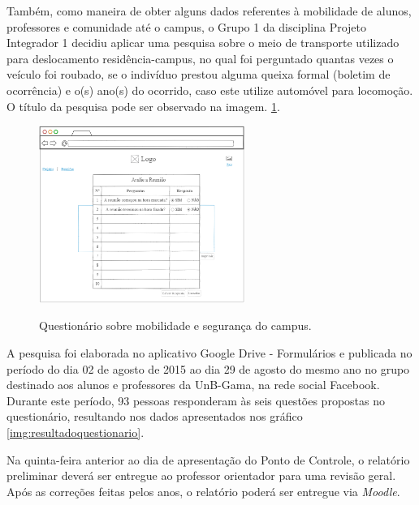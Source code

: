 Também, como maneira de obter alguns dados referentes à mobilidade de alunos, professores e comunidade até o campus, o Grupo 1 da disciplina Projeto Integrador 1 decidiu aplicar uma pesquisa sobre o meio de transporte utilizado para deslocamento residência-campus, no qual foi perguntado quantas vezes o veículo foi roubado, se o indivíduo prestou alguma queixa formal (boletim de ocorrência) e o(s) ano(s) do ocorrido, caso este utilize automóvel para locomoção. O título da pesquisa pode ser observado na imagem. \ref{img:questionario}.

\begin{figure}[htp]
	\centering
	\caption{Questionário sobre mobilidade e segurança do campus.}
	\includegraphics[width=0.6\textwidth]{figuras/questionario}
	\label{img:questionario}
\end{figure}

A pesquisa foi elaborada no aplicativo Google Drive - Formulários e publicada no período do dia 02 de agosto de 2015 ao dia 29 de agosto do mesmo ano no grupo destinado aos alunos e professores da UnB-Gama, na rede social Facebook. Durante este período, 93 pessoas responderam às seis questões propostas no questionário, resultando nos dados apresentados nos gráfico \ref{img:resultadoquestionario}.



Na quinta-feira anterior ao dia de apresentação do Ponto de Controle, o relatório preliminar deverá ser entregue ao professor orientador para uma revisão geral. Após as correções feitas pelos anos,  o relatório poderá  ser entregue via \textit{Moodle}.

